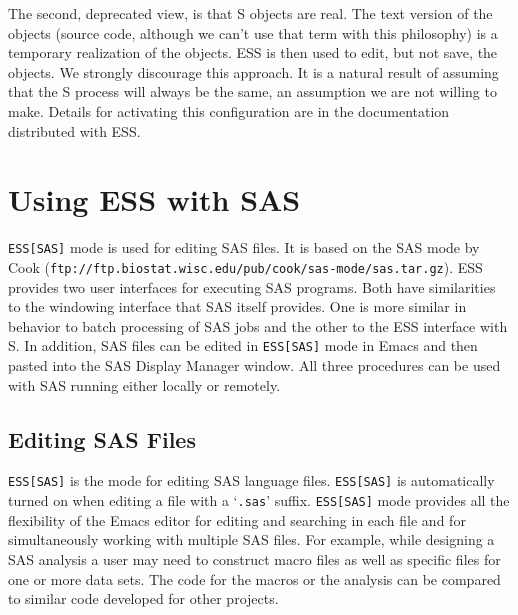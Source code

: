 \documentclass{article}
\newcommand{\stexttt}[1]{{\small\texttt{#1}}}
\newcommand{\ssf}[1]{{\small\sf{#1}}}
\newenvironment{Salltt}{\small\begin{alltt}}{\end{alltt}}
\newcommand{\file}[1]{`\stexttt{#1}'}
\begin{document}
The second, deprecated view, is that S objects are real.  The text
version of the objects (source code, although we can't use that term
with this philosophy) 
is a temporary realization of the objects.  ESS is then used to edit, but
not save, the objects.
We strongly discourage this approach.
It is a
natural result of assuming that the S process will always be the
same, an assumption we are not willing to make.
Details for activating this configuration are in the
documentation distributed with ESS.


\section{Using ESS with SAS}
\label{sec:SAS}

\stexttt{ESS[SAS]} mode is used for editing SAS files.  It is based on
the SAS mode by Cook
(\stexttt{ftp://ftp.biostat.wisc.edu/pub/cook/sas-mode/sas.tar.gz}).
ESS provides two user interfaces for executing SAS
programs.  Both have similarities to the
windowing interface that SAS itself provides.
One is more similar in behavior to batch processing of SAS jobs
and the other to the ESS interface with S.  In addition, SAS files can be
edited in \stexttt{ESS[SAS]} mode in Emacs and then pasted into the SAS
Display Manager \ssf{Program Editor} window.  All three procedures can
be used with SAS running either locally or remotely.

\subsection{Editing SAS Files}
\label{sec:SAS:edit}

\stexttt{ESS[SAS]} is the mode for editing SAS language files. 
\stexttt{ESS[SAS]} is automatically turned on when editing a file with
a \file{.sas} suffix.  \stexttt{ESS[SAS]} mode provides all the
flexibility of the Emacs editor for editing and searching in each file
and for simultaneously working with multiple SAS files.  For example,
while designing a SAS analysis a user may need to construct macro
files as well as specific files for one or more data sets.  The code
for the macros or the analysis can be compared to similar code
developed for other projects.
\end{document}
